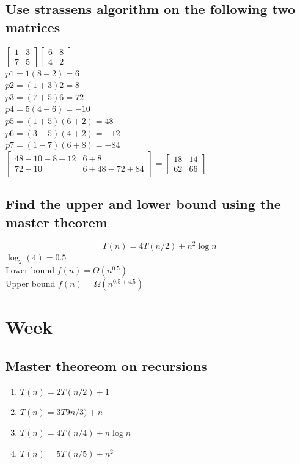 \documentclass[12pt, a4paper]{article}
\begin{document}
			\subsection{Use strassens algorithm on the following two matrices}
				$\begin{bmatrix}1&3\\ 7&5\end{bmatrix}\begin{bmatrix}6&8\\ 4&2\end{bmatrix}$\\
				$p1=1(8-2)=6$\\
				$p2=(1+3)2=8$\\
				$p3=(7+5)6=72$\\
				$p4=5(4-6)=-10$\\
				$p5=(1+5)(6+2)=48$\\
				$p6=(3-5)(4+2)=-12$\\
				$p7=(1-7)(6+8)=-84$\\
				$\begin{bmatrix}48-10-8-12&6+8\\ 72-10&6+48-72+84\end{bmatrix}=\begin{bmatrix}18&14\\ 62&66\end{bmatrix}$
			\subsection{Find the upper and lower bound using the master theorem}
				$$T(n)=4T(n/2)+n^2\log n$$
				$\log_2(4)=0.5$ \\
				Lower bound $f(n)=\Theta(n^{0.5})$\\
				Upper bound $f(n)=\Omega( n^{0.5+4.5})$
	\section{Week}
		\subsection{Master theoreom on recursions}
			\begin{enumerate}
				\item $T(n)=2T(n/2)+1$
				\item $T(n)=3T9n/3)+n$
				\item $T(n)=4T(n/4)+n\log n$
				\item $T(n)=5T(n/5)+n^2$
			\end{enumerate}
\end{document}
